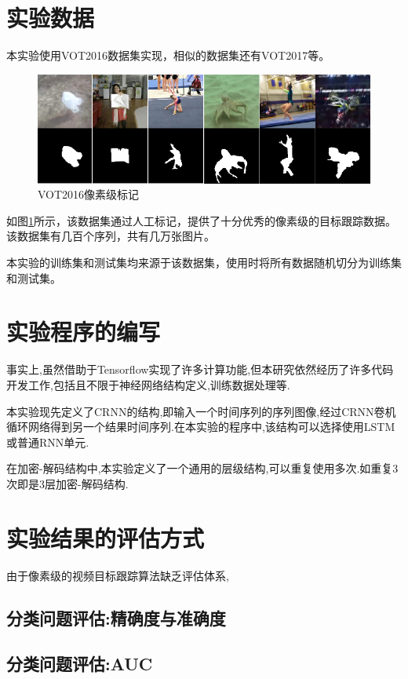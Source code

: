 \section{实验数据}
本实验使用VOT2016数据集\supercite{Vojir-TR-2017-01}实现，相似的数据集还有VOT2017等。
\par
\begin{figure}[htbp!]
    \centering
    \includegraphics[width = 1.\textwidth]{chap/img/vot_2016_pixel.png}
    \caption{VOT2016像素级标记}\label{fig:vot_2016_pixel}
\end{figure}
\par
如图\ref{fig:vot_2016_pixel}所示，该数据集通过人工标记，提供了十分优秀的像素级的目标跟踪数据。该数据集有几百个序列，共有几万张图片。
\par
本实验的训练集和测试集均来源于该数据集，使用时将所有数据随机切分为训练集和测试集。


\section{实验程序的编写}
事实上,虽然借助于Tensorflow实现了许多计算功能,但本研究依然经历了许多代码开发工作,包括且不限于神经网络结构定义,训练数据处理等.
\par
本实验现先定义了CRNN的结构,即输入一个时间序列的序列图像,经过CRNN卷机循环网络得到另一个结果时间序列.在本实验的程序中,该结构可以选择使用LSTM或普通RNN单元.
\par
在加密-解码结构中,本实验定义了一个通用的层级结构,可以重复使用多次.如重复3次即是3层加密-解码结构.

\section{实验结果的评估方式}
由于像素级的视频目标跟踪算法缺乏评估体系,

\subsection{分类问题评估:精确度与准确度}
\subsection{分类问题评估:AUC}